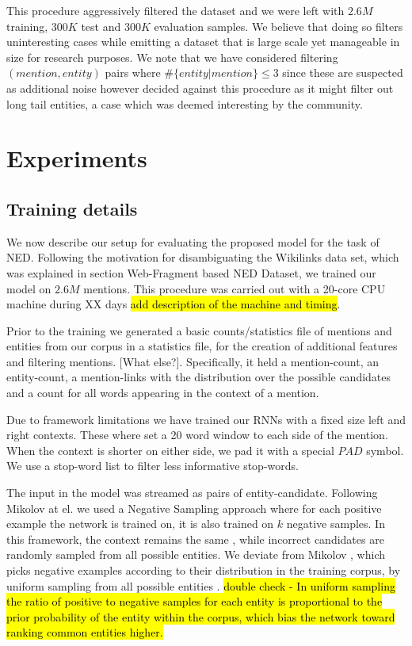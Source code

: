 \documentclass[11pt]{article}
\begin{document}
	This procedure aggressively filtered the dataset and we were left with $2.6M$ training, $300K$ test and $300K$ evaluation samples. We believe that doing so filters uninteresting cases while emitting a dataset that is large scale yet manageable in size for research purposes. We note that we have considered filtering $(mention,entity)$ pairs where $\#\{entity|mention\}\le 3$ since these are suspected as additional noise however decided against this procedure as it might filter out long tail entities, a case which was deemed interesting by the community.
	
	\section{Experiments}
	
	\subsection{Training details}
	We now describe our setup for evaluating the proposed model for the task of NED. Following the motivation for disambiguating the Wikilinks data set, which was explained in section \refname{Web-Fragment based NED Dataset}, we trained our model on $2.6M$ mentions. This procedure was carried out with a 20-core CPU machine during XX days \hl{add description of the machine and timing}.
	
	Prior to the training we generated a basic counts/statistics file of mentions and entities from our corpus in a statistics file, for the creation of additional features and filtering mentions.  [What else?]. Specifically, it held a mention-count, an entity-count, a mention-links with the distribution over the possible candidates and a count for all words appearing in the context of a mention. 

	Due to framework limitations we have trained our RNNs with a fixed size left and right contexts. These where set a 20 word window to each side of the mention. When the context is shorter on either side, we pad it with a special $PAD$ symbol. We use a stop-word list to filter less informative stop-words.
	
	The input in the model was streamed as pairs of entity-candidate. Following Mikolov at el. \cite{mikolov2013distributed} we used a Negative Sampling approach where for each positive example the network is trained on, it is also trained on $k$ negative samples. In this framework, the context remains the same , while incorrect candidates are randomly sampled from all possible entities. We deviate from Mikolov , which picks negative examples according to their distribution in the training corpus, by uniform sampling from all possible entities . \hl{double check - In uniform sampling the ratio of positive to negative samples for each entity is proportional to the prior probability of the entity within the corpus, which bias the network toward ranking common entities higher.}
	
\end{document}
